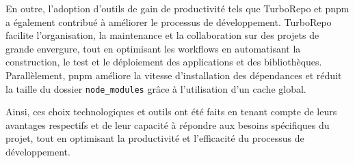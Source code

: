 En outre, l'adoption d'outils de gain de productivité tels que TurboRepo et pnpm a également contribué à améliorer le processus de développement. TurboRepo facilite l'organisation, la maintenance et la collaboration sur des projets de grande envergure, tout en optimisant les workflows en automatisant la construction, le test et le déploiement des applications et des bibliothèques. Parallèlement, pnpm améliore la vitesse d'installation des dépendances et réduit la taille du dossier \verb|node_modules| grâce à l'utilisation d'un cache global.

Ainsi, ces choix technologiques et outils ont été faits en tenant compte de leurs avantages respectifs et de leur capacité à répondre aux besoins spécifiques du projet, tout en optimisant la productivité et l'efficacité du processus de développement.